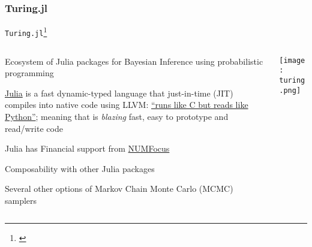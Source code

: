 \subsubsection{Turing.jl}
\begin{frame}{\texttt{Turing.jl}\footnote{\textcite{geTuringLanguageFlexible2018}}}
	\begin{columns}
		\begin{column}{0.8\textwidth}
			\begin{vfilleditems}
				\small
				\item Ecosystem of Julia packages for Bayesian
				Inference using probabilistic programming
				\item \href{https://www.julialang.org}{Julia} is a fast
				dynamic-typed language that just-in-time (JIT)
				compiles into native code using LLVM:
				\href{https://www.nature.com/articles/d41586-019-02310-3}{``runs like C but reads like Python''};
				meaning that is \textit{blazing} fast, easy to prototype and read/write code
				\item Julia has Financial support from
				\href{https://numfocus.org/}{NUMFocus}
				\item Composability with other Julia packages
				\item Several other options of Markov Chain Monte Carlo (MCMC) samplers
			\end{vfilleditems}
		\end{column}
		\begin{column}{0.2\textwidth}
			\centering
			\texttt{[image: turing.png]}
		\end{column}
	\end{columns}
\end{frame}


